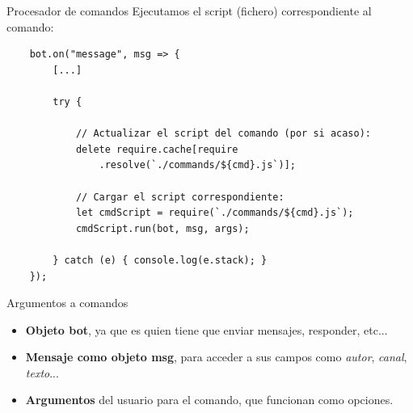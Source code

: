 \documentclass[10pt]{beamer} %
\begin{document}
\begin{frame}[fragile]{Procesador de comandos}
    Ejecutamos el script (fichero) correspondiente al comando:
    \begin{verbatim}
    bot.on("message", msg => {
        [...]
        
        try {
        
            // Actualizar el script del comando (por si acaso):
            delete require.cache[require
                .resolve(`./commands/${cmd}.js`)];
                
            // Cargar el script correspondiente:
            let cmdScript = require(`./commands/${cmd}.js`);
            cmdScript.run(bot, msg, args);
            
        } catch (e) { console.log(e.stack); }
    });
    \end{verbatim}
\end{frame}
\begin{frame}{Argumentos a comandos}
    \begin{itemize}
        \item \textbf{Objeto bot}, ya que es quien tiene que enviar mensajes, responder, etc...
        \item \textbf{Mensaje como objeto msg}, para acceder a sus campos como \textit{autor}, \textit{canal}, \textit{texto}...
        \item \textbf{Argumentos} del usuario para el comando, que funcionan como opciones.
    \end{itemize}
\end{frame}
\end{document}

